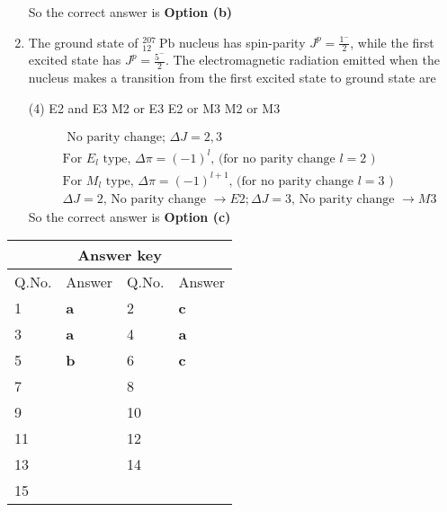 \begin{enumerate}
\begin{answer}
		So the correct answer is \textbf{Option (b)}
	\end{answer}
	\item The ground state of ${ }_{12}^{207} \mathrm{~Pb}$ nucleus has spin-parity $J^p=\frac{1^{-}}{2}$, while the first excited state has $J^p=\frac{5^{-}}{2}$. The electromagnetic radiation emitted when the nucleus makes a transition from the first excited state to ground state are
	{}
	\begin{tasks}(4)
		\task[\textbf{a.}]E2 and E3
		\task[\textbf{b.}]M2 or E3
		\task[\textbf{c.}]E2 or M3
		\task[\textbf{d.}]M2 or M3 
	\end{tasks}
	\begin{answer}
		\begin{align*}
		&\text{ No parity change; }\Delta J=2,3\\
		&\text{For $E_l$ type, $\Delta \pi=(-1)^l$, (for no parity change $l=2$ )}\\
		&\text{For $M_l$ type, $\Delta \pi=(-1)^{l+1}$, (for no parity change $l=3$ )}\\
		&\text{$\Delta J=2$, No parity change $\rightarrow E 2 ; \Delta J=3$, No parity change $\rightarrow M 3$}
		\end{align*}
		So the correct answer is \textbf{Option (c)}
	\end{answer}
\end{enumerate}
\setlength\arrayrulewidth{1pt}
\begin{table}[H]
	\centering
	\begin{tabular}{|p{1.5cm}|p{1.5cm}||p{1.5cm}|p{1.5cm}|}
		\hline
		\multicolumn{4}{|c|}{\textbf{Answer key}}\\\hline\hline
		\rowcolor{ocrel}Q.No.&Answer&Q.No.&Answer\\\hline
		1&\textbf{a} &2&\textbf{c}\\\hline 
		3&\textbf{a} &4&\textbf{a} \\\hline
		5&\textbf{b} &6&\textbf{c} \\\hline
		7&\textbf{}&8&\textbf{}\\\hline
		9&\textbf{}&10&\textbf{}\\\hline
		11&\textbf{} &12&\textbf{}\\\hline
		13&\textbf{}&14&\textbf{}\\\hline
		15&\textbf{}& &\\\hline
		
	\end{tabular}
\end{table}


